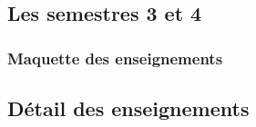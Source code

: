 \documentclass[10pt, a5paper]{report}
\begin{document}
\begin{spacing}{1.0}
\subsection*{Les semestres 3 et 4}

\subsubsection*{Maquette des enseignements}



\subsection*{Détail des enseignements}

\end{spacing}
\end{document}

